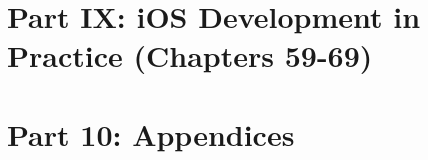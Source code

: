 \documentclass[11pt,a4paper,openany]{book}
\begin{document}
\part*{Part IX: iOS Development in Practice (Chapters 59-69)}











\appendix
\part*{Part 10: Appendices}









\end{document}
